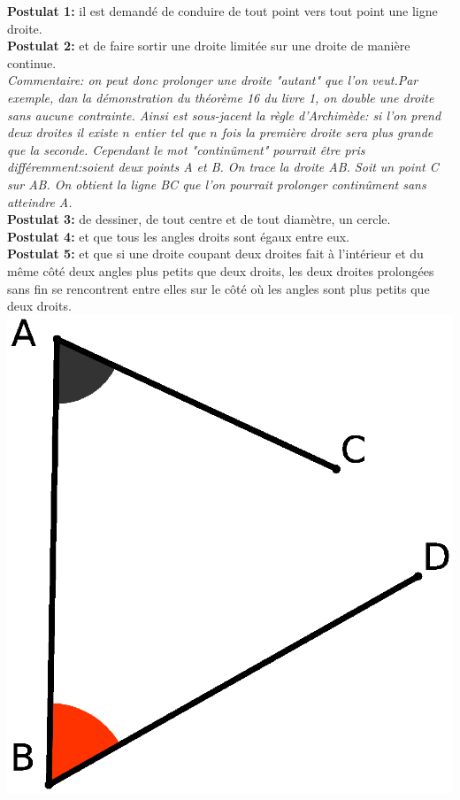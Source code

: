\documentclass[a4paper, 12pt, twoside]{book}
\begin{document}
\textbf{Postulat 1:} il est demandé de conduire de tout point vers tout point une ligne droite.\\



\textbf{Postulat 2:} et de faire sortir une droite limitée sur une droite de manière continue.\\


\textit{Commentaire: on peut donc prolonger une droite "autant" que l'on veut.Par exemple, dan la démonstration du théorème 16 du livre 1, on double une droite sans aucune contrainte. Ainsi est sous-jacent la règle d'Archimède: si l'on prend deux droites il existe $n$ entier tel que $n$ fois la première droite sera plus grande que la seconde. 
Cependant le mot "continûment" pourrait être pris différemment:soient deux points A et B. On trace la droite AB. Soit un point C sur AB. On obtient la ligne BC que l'on pourrait prolonger continûment sans atteindre A.}\\


\textbf{Postulat 3:} de dessiner, de tout centre et de tout diamètre, un cercle.\\



\textbf{Postulat 4:} et que tous les angles droits sont égaux entre eux.\\



\textbf{Postulat 5:} et que si une droite coupant deux droites fait à l'intérieur et du même côté deux angles plus petits que deux droits, les deux droites prolongées sans fin se rencontrent entre elles sur le côté où les angles sont plus petits que deux droits.\\

\includegraphics[scale=0.4]{figures/Postulat5.eps}\
\end{document}

